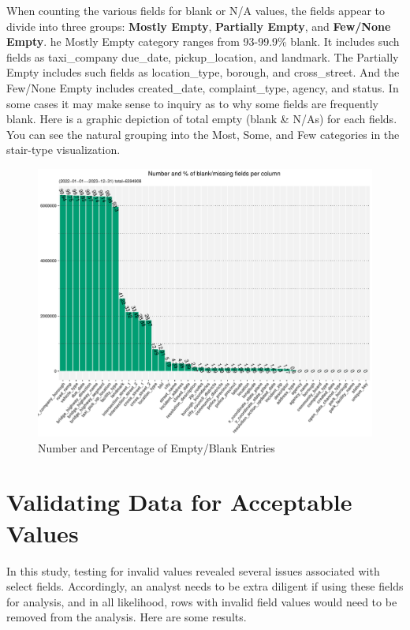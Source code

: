 \documentclass[12pt, titlepage]{article}
\begin{document}
When counting the various fields for blank or N/A values, the fields appear 
to divide into three groups: \textbf{Mostly Empty}, \textbf{Partially Empty}, 
and \textbf{Few/None Empty}. he Mostly Empty category ranges from 93-99.9\% blank. 
It includes such fields as taxi\_company due\_date, pickup\_location, and 
landmark. The Partially Empty includes such fields as location\_type, borough, 
and cross\_street. And the Few/None Empty includes created\_date, 
complaint\_type, agency, and status. In some cases it may make 
sense to inquiry as to why some fields are frequently blank. Here is a graphic 
depiction of total empty (blank \& N/As) for each fields. You can see 
the natural grouping into the Most, Some, and Few categories 
in the stair-type visualization. 

\begin{figure}[tbp]
	\centering
  	\includegraphics[width=\textwidth]{BlankFields.pdf}
	\caption{Number and Percentage of Empty/Blank Entries}
	\label{fig:blank_fields}
\end{figure}




 \section{Validating Data for Acceptable Values}
 \label{sec:domain}
 In this study, testing for invalid values revealed several issues 
 associated with select fields. Accordingly, an analyst needs to be 
 extra diligent if using these fields for analysis, and in all likelihood, 
 rows with invalid field values would  need to be removed from the 
 analysis. Here are some results.
\end{document}

